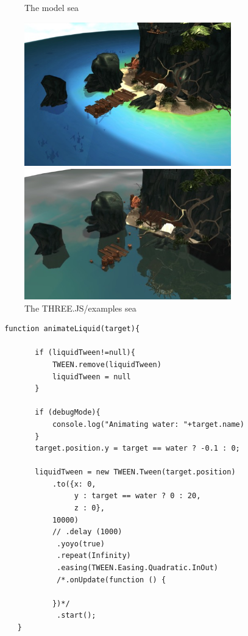 \documentclass[10pt,a4paper]{article}
\begin{document}
\begin{figure}[H]
\centering
\caption{The model sea}
\includegraphics[width=0.8\textwidth]{sea}

\centering
\caption{The THREE.JS/examples sea}
\includegraphics[width=0.8\textwidth]{sea_example}
\end{figure}

\begin{verbatim}
 function animateLiquid(target){

        if (liquidTween!=null){
            TWEEN.remove(liquidTween)
            liquidTween = null
        }

        if (debugMode){
            console.log("Animating water: "+target.name)
        }
        target.position.y = target == water ? -0.1 : 0;

        liquidTween = new TWEEN.Tween(target.position)
            .to({x: 0, 
                 y : target == water ? 0 : 20, 
                 z : 0},
            10000)
            // .delay (1000)
             .yoyo(true)
             .repeat(Infinity)
             .easing(TWEEN.Easing.Quadratic.InOut)
             /*.onUpdate(function () {
               
            })*/
             .start();
    }
\end{verbatim}
\end{document}
